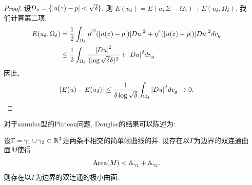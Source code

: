 \begin{proof}
    设$\Omega_\delta=\{{\left | u(z)-p \right |} < \sqrt{\delta}\}$. 则 $E(u_\delta)=E(u,\Sigma-\Omega_\delta)+E(u_\delta, \Omega_\delta)$. 我们计算第二项.
    \begin{equation}
        \begin{split}
            E(u_\delta, \Omega_\delta) & ={{\frac{1}{2}}}\int_{\Omega_\delta} {\eta'}^2({\left | u(z)-p \right |}){\left | Du \right |}^2+\eta^2({\left | u(z)-p \right |}) {\left | Du \right |}^2 dv_g\\
            &\le {{\frac{1}{2}}}\int_{\Omega_\delta} \frac{{\left | Du \right |}^2}{(\log\sqrt{\delta}\delta)^2} +{\left | Du \right |}^2dv_g
        \end{split}
    \end{equation}
    因此, 
    \begin{equation}
        {\left | E(u)-E(u_\delta) \right |} \le \frac{1}{\delta\log\sqrt{\delta}}\int_{\Omega_\delta} {\left | Du \right |}^2dv_g \to 0.
    \end{equation}
\end{proof}
对于annulus型的Plateau问题, Douglas的结果可以陈述为:
\begin{theorem}\label{theorem_douglas_annulus}
    设$\Gamma= \gamma_1 \cup \gamma_2 \subset {\mathbb{R}}^3$是两条不相交的简单闭曲线的并. 设存在以$\Gamma$为边界的双连通曲面$M$使得
    \begin{equation} \label{douglas_condition_annulus}
        \text{Area}(M) < {\mathbb{A}}_{\gamma_1}+{\mathbb{A}}_{\gamma_2}.
    \end{equation}
    则存在以$\Gamma$为边界的双连通的极小曲面.
\end{theorem}
